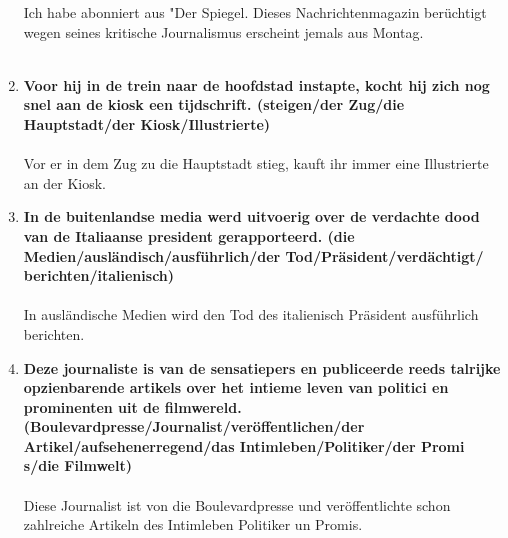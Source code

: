 \documentclass[main.tex]{subfiles}
\begin{document}
\begin{enumerate}
Ich habe abonniert aus "Der Spiegel. Dieses Nachrichtenmagazin berüchtigt wegen seines kritische Journalismus erscheint jemals aus Montag.
\\
\\
\item \textbf{Voor hij in de trein naar de hoofdstad instapte, kocht hij zich nog snel aan de kiosk een tijdschrift. (steigen/der Zug/die Hauptstadt/der Kiosk/Illustrierte)}\\ \\
Vor er in dem Zug zu die Hauptstadt stieg, kauft ihr immer eine Illustrierte an der Kiosk.
\\
\item \textbf{In de buitenlandse media werd uitvoerig over de verdachte dood van de Italiaanse president gerapporteerd. (die Medien/ausländisch/ausführlich/der Tod/Präsident/verdächtigt/ berichten/italienisch)} \\ \\
In ausländische Medien wird den Tod des italienisch Präsident ausführlich berichten.
\\
\item \textbf{Deze journaliste is van de sensatiepers en publiceerde reeds talrijke opzienbarende artikels over het intieme leven van politici en prominenten uit de filmwereld. (Boulevardpresse/Journalist/veröffentlichen/der Artikel/aufsehenerregend/das Intimleben/Politiker/der Promi s/die Filmwelt)} \\ \\
Diese Journalist ist von die Boulevardpresse und veröffentlichte schon zahlreiche Artikeln des Intimleben Politiker un Promis.


\end{enumerate}
\end{document}

